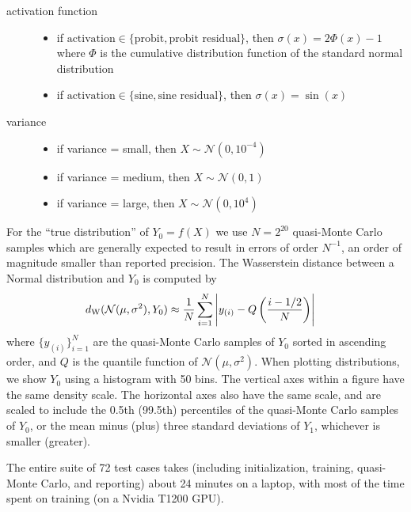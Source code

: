 \documentclass{article}
\begin{document}
\begin{description}
\begin{itemize}
  \end{itemize}
  \item[activation function] 
  \begin{itemize}
    \item if \(\text{activation} \in \{\text{probit}, \text{probit residual}\}\), then \(\sigma(x) = 2\Phi(x) - 1\) where \(\Phi\) is the cumulative distribution function of the standard normal distribution
    \item if \(\text{activation} \in \{\text{sine}, \text{sine residual}\}\), then \(\sigma(x) = \sin(x)\)
  \end{itemize}
  \item[variance]
  \begin{itemize}
    \item if variance = small, then \(X \sim \mathcal N(0, 10^{-4})\)
    \item if variance = medium, then \(X \sim \mathcal N(0, 1)\)
    \item if variance = large, then \(X \sim \mathcal N(0, 10^4)\)
  \end{itemize}
\end{description}

For the ``true distribution'' of \(Y_0=f(X)\) we use \(N=2^{20}\) quasi-Monte Carlo samples \citep{virtanen_scipy_2020} which are generally expected to result in errors of order \(N^{-1}\), an order of magnitude smaller than reported precision.
The Wasserstein distance between a Normal distribution and \(Y_0\) is computed by
\begin{align*}
  d_\mathrm{W}(\mathcal N(\mu, \sigma^2), Y_0) 
  &\approx \frac{1}{N}\sum_{i=1}^N \left|y_{(i)} - Q\del{\frac{i -1/2}{N}}\right|
\end{align*}
where \(\{y_{(i)}\}_{i=1}^N\) are the quasi-Monte Carlo samples of \(Y_0\) sorted in ascending order, and \(Q\) is the quantile function of \(\mathcal N(\mu, \sigma^2)\).
When plotting distributions, we show \(Y_0\) using a histogram with 50 bins.
The vertical axes within a figure have the same density scale.
The horizontal axes also have the same scale, and are scaled to include the 0.5th (99.5th) percentiles of the quasi-Monte Carlo samples of \(Y_0\), or the mean minus (plus) three standard deviations of \(Y_1\), whichever is smaller (greater).

The entire suite of 72 test cases takes (including initialization, training, quasi-Monte Carlo, and reporting) about 24 minutes
on a laptop, with most of the time spent on training (on a Nvidia T1200 GPU).

\end{document}
